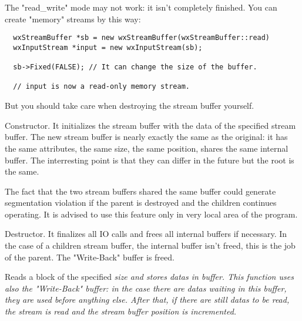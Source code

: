 
The "read\_write" mode may not work: it isn't completely finished.
You can create "memory" streams by this way:

\begin{verbatim}
  wxStreamBuffer *sb = new wxStreamBuffer(wxStreamBuffer::read)
  wxInputStream *input = new wxInputStream(sb);

  sb->Fixed(FALSE); // It can change the size of the buffer.

  // input is now a read-only memory stream.
\end{verbatim}

But you should take care when destroying the stream buffer yourself.


Constructor. It initializes the stream buffer with the data of the specified
stream buffer. The new stream buffer is nearly exactly the same as the
original: it has the same attributes, the same size, the same position, shares
the same internal buffer. The interresting point is that they can differ
in the future but the root is the same.


The fact that the two stream buffers shared the same buffer could generate
segmentation violation if the parent is destroyed and the children continues
operating. It is advised to use this feature only in very local area of the
program.





Destructor. It finalizes all IO calls and frees all internal buffers if
necessary. In the case of a children stream buffer, the internal buffer isn't
freed, this is the job of the parent.
The "Write-Back" buffer is freed.

\label{wxstreambufferread}


Reads a block of the specified \it{size} and stores datas in \it{buffer}.
This function uses also the "Write-Back" buffer: in the case there are datas
waiting in this buffer, they are used before anything else. After that, if there
are still datas to be read, the stream is read and the stream buffer position
is incremented.

